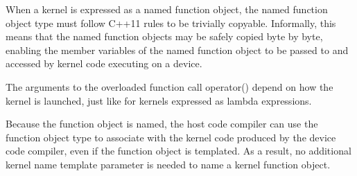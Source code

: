 When a kernel is expressed as a named function object, the named function object type must follow C++11 rules to be trivially copyable. Informally, this means that the named function objects may be safely copied byte by byte, enabling the member variables of the named function object to be passed to and accessed by kernel code executing on a device.\par

The arguments to the overloaded function call operator() depend on how the kernel is launched, just like for kernels expressed as lambda expressions.\par

Because the function object is named, the host code compiler can use the function object type to associate with the kernel code produced by the device code compiler, even if the function object is templated. As a result, no additional kernel name template parameter is needed to name a kernel function object.\par













